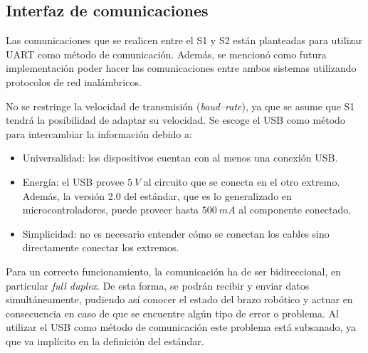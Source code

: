 \subsection{Interfaz de comunicaciones}
Las comunicaciones que se realicen entre el \ac{S1} y \ac{S2} están planteadas para utilizar \ac{UART} como método de comunicación. Además, se mencionó como futura implementación poder hacer las comunicaciones entre ambos sistemas utilizando protocolos de red inalámbricos.

No se restringe la velocidad de transmisión (\textit{baud--rate}), ya que se asume que \ac{S1} tendrá la posibilidad de adaptar su velocidad. Se escoge el \ac{USB} como método para intercambiar la información debido a:

\begin{itemize}
    \item Universalidad: los dispositivos cuentan con al menos una conexión \ac{USB}.
    \item Energía: el \ac{USB} provee $5~V$ al circuito que se conecta en el otro extremo. Además, la versión 2.0 del estándar, que es lo generalizado en microcontroladores, puede proveer hasta $500~mA$ al componente conectado.
    \item Simplicidad: no es necesario entender cómo se conectan los cables sino directamente conectar los extremos.
\end{itemize}

Para un correcto funcionamiento, la comunicación ha de ser bidireccional, en particular \textit{full duplex}. De esta forma, se podrán recibir y enviar datos simultáneamente, pudiendo así conocer el estado del brazo robótico y actuar en consecuencia en caso de que se encuentre algún tipo de error o problema. Al utilizar el \ac{USB} como método de comunicación este problema está subsanado, ya que va implícito en la definición del estándar.